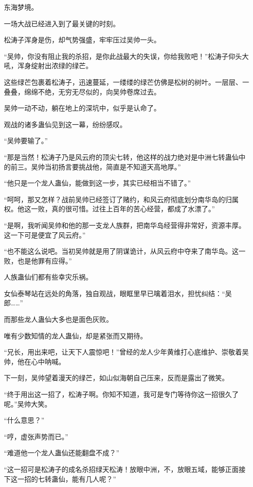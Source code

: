 
\begin{this_body}

东海梦境。

一场大战已经进入到了最关键的时刻。

松涛子浑身是伤，却气势强盛，牢牢压过吴帅一头。

“吴帅，你没有阻止我的杀招，是你此战最大的失误，你给我败吧！”松涛子仰头大吼，浑身绽射出浓绿的绿芒。

这些绿芒包裹着松涛子，迅速蔓延，一缕缕的绿芒仿佛是松树的树叶。一层层、一叠叠，绵绵不绝，无穷无尽似的，向吴帅卷席过去。

吴帅一动不动，躺在地上的深坑中，似乎是认命了。

观战的诸多蛊仙见到这一幕，纷纷感叹。

“吴帅要输了。”

“那是当然！松涛子乃是风云府的顶尖七转，他这样的战力绝对是中洲七转蛊仙中的前三。吴帅当初扬言要挑战他，简直是不知道天高地厚。”

“他只是一个龙人蛊仙，能做到这一步，其实已经相当不错了。”

“呵呵，那又怎样？战前吴帅已经签订了赌约，和风云府彻底划分南华岛的归属权。他这一败，真的很可惜。过往上百年的苦心经营，都成了水漂了。”

“是啊，我听闻吴帅和他的那一支龙人族群，把南华岛经营得非常好，资源丰厚。这一下可是便宜了风云府。”

“也不能这么说吧。当初吴帅就是用了阴谋诡计，从风云府中夺来了南华岛。这一败，也是他罪有应得。”

人族蛊仙们都有些幸灾乐祸。

女仙泰琴站在远处的角落，独自观战，眼眶里早已噙着泪水，担忧纠结：“吴郎……”

而那些龙人蛊仙大多也是面色灰败。

唯有少数知情的龙人蛊仙，却是紧张而又期待。

“兄长，用出来吧，让天下人震惊吧！”曾经的龙人少年黄维打心底维护、崇敬着吴帅，他在心中呐喊。

下一刻，吴帅望着漫天的绿芒，如山似海朝自己压来，反而是露出了微笑。

“终于用出这一招了，松涛子啊。你知不知道，我可是专门等待你这一招很久了呢。”吴帅大笑。

“什么意思？”

“哼，虚张声势而已。”

“难道他一个龙人蛊仙还能翻盘不成？”

“这一招可是松涛子的成名杀招绿天松涛！放眼中洲，不，放眼五域，能够正面接下这一招的七转蛊仙，能有几人呢？”


\end{this_body}
